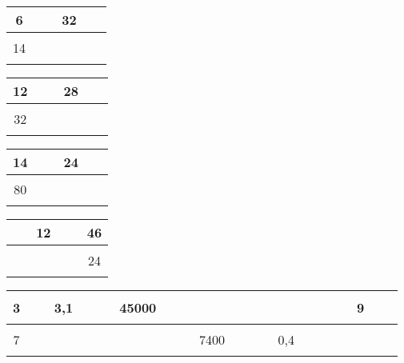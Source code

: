 \begin{multicols}{4}\noindent
  \begin{center} \begin{tabular}{|c|c|}  \hline
      6    & 32\\  \hline
      14 & $\phantom{\dfrac{azertyuiop}{O}}$\\  \hline
    \end{tabular} \end{center}
  \Pointilles[3]
  \begin{center} \begin{tabular}{|c|c|}   \hline
      12  & 28\\  \hline
      32 & $\phantom{\dfrac{azertyuiop}{O}}$\\  \hline
    \end{tabular} \end{center}
    \Pointilles[3]
  \begin{center} \begin{tabular}{|c|c|}   \hline
      14  & 24\\  \hline
      80 & $\phantom{\dfrac{azertyuiop}{O}}$\\  \hline
    \end{tabular} \end{center}
    \Pointilles[3]
  \begin{center}\begin{tabular}{|c|c|}  \hline
      12 & 46\\  \hline
      $\phantom{\dfrac{azertyuiop}{O}}$ & 24\\  \hline
    \end{tabular} \end{center}
    \Pointilles[3]
\end{multicols}

\begin{center} \begin{tabular}{|c|c|c|c|c|c|} \hline
   3 &  3,1                   &                  45000 &  $\phantom{\dfrac{azertyuiop}{O}}$ & $\phantom{\dfrac{azertyuiop}{O}}$&                     9\\ \hline
   7 &  $\phantom{\dfrac{azertyuiop}{O}}$ & $\phantom{\dfrac{azertyuiop}{O}}$ &                   7400 &                    0,4 &  $\phantom{\dfrac{azertyuiop}{O}}$\\ \hline     
  \end{tabular}\end{center}

\Pointilles[8]


\newpage


